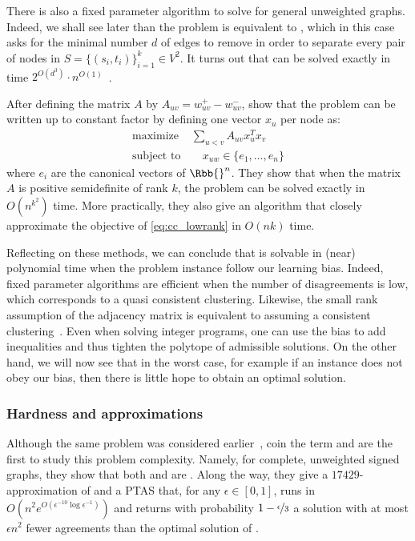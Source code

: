 There is also a fixed parameter algorithm to solve \mind{} for general unweighted graphs. Indeed, we
shall see later than the problem is equivalent to \mmc{}, which in this case asks for the minimal
number $d$ of edges to remove in order to separate every pair of nodes in $S=\{(s_i,t_i)\}_{i=1}^k
\in V^2$. It turns out that \mmc{} can be solved exactly in time $2^{O(d^3)}\cdot
n^{O(1)}$~\autocite{FPAMulticut14}.

After defining the matrix $A$ by $A_{uv} = w_{uv}^+ - w_{uv}^-$, \textcite{LowRank16} show that the
\maxa{} problem can be written up to constant factor by defining one vector $x_u$ per node as:
\begin{align}
   \label{eq:cc_lowrank}
   \text{maximize } & \sum_{u<v} A_{uv}x_u^Tx_v \\
   \text{subject to}& \quad x_{uw} \in \{e_1,\ldots, e_n\} \nonumber
\end{align}
where $e_i$ are the canonical vectors of $\Rbb{}^n$. They show that when the matrix $A$ is positive
semidefinite of rank $k$, the \pcc{} problem can be solved exactly in $O(n^{k^2})$ time. More
practically, they also give an algorithm that closely approximate the objective of
\eqref{eq:cc_lowrank} in $O(nk)$ time.

\bigskip

Reflecting on these methods, we can conclude that \pcc{} is solvable in (near) polynomial time
when the problem instance follow our learning bias. Indeed, fixed parameter algorithms are efficient
when the number of disagreements is low, which corresponds to a quasi consistent clustering.
Likewise, the small rank assumption of the adjacency matrix is equivalent to assuming a consistent
clustering~\autocite[Theorem 13]{LowRankCompletion14}. Even when solving integer programs, one can
use the bias to add inequalities and thus tighten the polytope of admissible solutions. On the other
hand, we will now see that in the worst case, for example if an instance does not obey our bias,
then there is little hope to obtain an optimal solution.

\subsubsection{Hardness and approximations}
\label{ssub:cc_harness_approx}

Although the same problem was considered earlier~\autocites{Early96}{Ben-Dor99}, \textcite{Bansal2002}
coin the term \pcc{} and are the first to study this problem complexity. Namely, for complete,
unweighted signed graphs, they show that both \mind{} and \maxa{} are \NPc{}. Along the way, they
give a $17429$-approximation of \mind{} and a PTAS
that, for any $\epsilon \in [0,1]$, runs in
$O(n^2e^{O(\epsilon^{-10}\log \epsilon^{-1})})$ and returns with probability
$1-\nicefrac{\epsilon}{3}$ a solution with at most $\epsilon n^2$ fewer agreements than the optimal
solution of \maxa{}.

